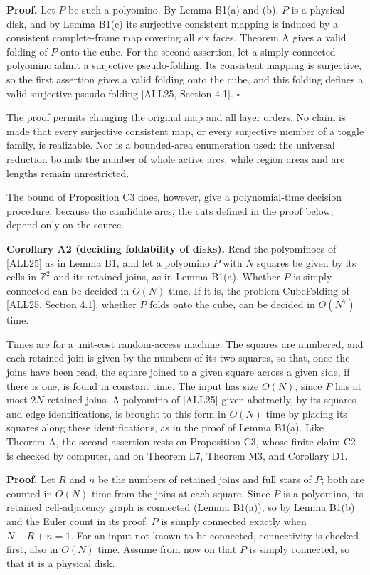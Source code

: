 \documentclass[
  11pt,
]{article}
\begin{document}
\textbf{Proof.} Let \(P\) be such a polyomino. By Lemma B1(a) and (b),
\(P\) is a physical disk, and by Lemma B1(c) its surjective consistent
mapping is induced by a consistent complete-frame map covering all six
faces. Theorem A gives a valid folding of \(P\) onto the cube. For the
second assertion, let a simply connected polyomino admit a surjective
pseudo-folding. Its consistent mapping is surjective, so the first
assertion gives a valid folding onto the cube, and this folding defines
a valid surjective pseudo-folding {[}ALL25, Section 4.1{]}. \(\square\)

The proof permits changing the original map and all layer orders. No
claim is made that every surjective consistent map, or every surjective
member of a toggle family, is realizable. Nor is a bounded-area
enumeration used: the universal reduction bounds the number of whole
active arcs, while region areas and arc lengths remain unrestricted.

The bound of Proposition C3 does, however, give a polynomial-time
decision procedure, because the candidate arcs, the cuts defined in the
proof below, depend only on the source.

\textbf{Corollary A2 (deciding foldability of disks).} Read the
polyominoes of {[}ALL25{]} as in Lemma B1, and let a polyomino \(P\)
with \(N\) squares be given by its cells in \(\mathbb Z^2\) and its
retained joins, as in Lemma B1(a). Whether \(P\) is simply connected can
be decided in \(O(N)\) time. If it is, the problem CubeFolding of
{[}ALL25, Section 4.1{]}, whether \(P\) folds onto the cube, can be
decided in \(O(N^7)\) time.

Times are for a unit-cost random-access machine. The squares are
numbered, and each retained join is given by the numbers of its two
squares, so that, once the joins have been read, the square joined to a
given square across a given side, if there is one, is found in constant
time. The input has size \(O(N)\), since \(P\) has at most \(2N\)
retained joins. A polyomino of {[}ALL25{]} given abstractly, by its
squares and edge identifications, is brought to this form in \(O(N)\)
time by placing its squares along these identifications, as in the proof
of Lemma B1(a). Like Theorem A, the second assertion rests on
Proposition C3, whose finite claim C2 is checked by computer, and on
Theorem L7, Theorem M3, and Corollary D1.

\textbf{Proof.} Let \(R\) and \(n\) be the numbers of retained joins and
full stars of \(P\); both are counted in \(O(N)\) time from the joins at
each square. Since \(P\) is a polyomino, its retained cell-adjacency
graph is connected (Lemma B1(a)), so by Lemma B1(b) and the Euler count
in its proof, \(P\) is simply connected exactly when \(N-R+n=1\). For an
input not known to be connected, connectivity is checked first, also in
\(O(N)\) time. Assume from now on that \(P\) is simply connected, so
that it is a physical disk.
\end{document}
